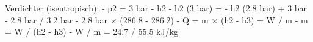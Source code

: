 Verdichter (isentropisch):
- p2 = 3 bar
- h2
- h2 (3 bar) = 
- h2 (2.8 bar) + 3 bar - 2.8 bar / 3.2 bar - 2.8 bar × (286.8 - 286.2)
- Q = m × (h2 - h3) = W / m
- m = W / (h2 - h3)
- W / m = 24.7 / 55.5 kJ/kg